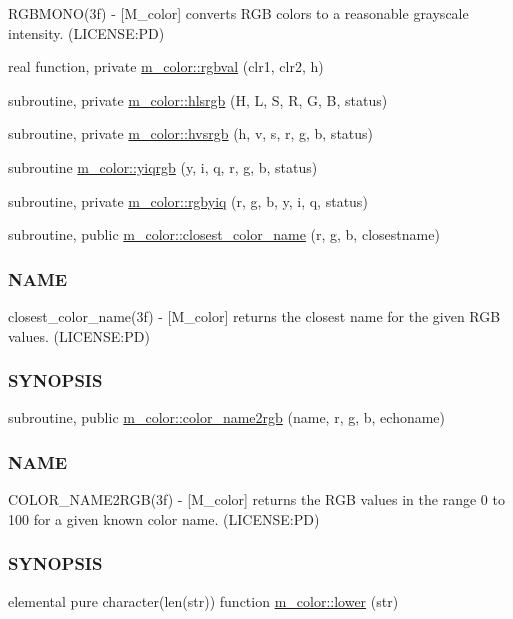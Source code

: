 \begin{DoxyCompactItemize}
\begin{DoxyCompactList}
R\+G\+B\+M\+O\+N\+O(3f) -\/ \mbox{[}M\+\_\+color\mbox{]} converts R\+GB colors to a reasonable grayscale intensity. (L\+I\+C\+E\+N\+SE\+:PD) \end{DoxyCompactList}\item 
real function, private \mbox{\hyperlink{namespacem__color_a3e97e24dba7b820f685f13eaa64a6caa}{m\+\_\+color\+::rgbval}} (clr1, clr2, h)
\item 
subroutine, private \mbox{\hyperlink{namespacem__color_a40e6c91da216384eded2157cdaf86eba}{m\+\_\+color\+::hlsrgb}} (H, L, S, R, G, B, status)
\item 
subroutine, private \mbox{\hyperlink{namespacem__color_a334ec90d94bbfb9a4c08c5f9efdb8c47}{m\+\_\+color\+::hvsrgb}} (h, v, s, r, g, b, status)
\item 
subroutine \mbox{\hyperlink{namespacem__color_ac9cd845fb9975144a6deb3a21ce29a29}{m\+\_\+color\+::yiqrgb}} (y, i, q, r, g, b, status)
\item 
subroutine, private \mbox{\hyperlink{namespacem__color_a386d004a1392b7e01ff66f1676d43def}{m\+\_\+color\+::rgbyiq}} (r, g, b, y, i, q, status)
\item 
subroutine, public \mbox{\hyperlink{namespacem__color_acad72628ee0b77cf87f40cd46734fb18}{m\+\_\+color\+::closest\+\_\+color\+\_\+name}} (r, g, b, closestname)
\begin{DoxyCompactList}\small\item\em \subsubsection*{N\+A\+ME}

closest\+\_\+color\+\_\+name(3f) -\/ \mbox{[}M\+\_\+color\mbox{]} returns the closest name for the given R\+GB values. (L\+I\+C\+E\+N\+SE\+:PD) \subsubsection*{S\+Y\+N\+O\+P\+S\+IS}\end{DoxyCompactList}\item 
subroutine, public \mbox{\hyperlink{namespacem__color_a84a36043d278bc56a7148483a862dec8}{m\+\_\+color\+::color\+\_\+name2rgb}} (name, r, g, b, echoname)
\begin{DoxyCompactList}\small\item\em \subsubsection*{N\+A\+ME}

C\+O\+L\+O\+R\+\_\+\+N\+A\+M\+E2\+R\+G\+B(3f) -\/ \mbox{[}M\+\_\+color\mbox{]} returns the R\+GB values in the range 0 to 100 for a given known color name. (L\+I\+C\+E\+N\+SE\+:PD) \subsubsection*{S\+Y\+N\+O\+P\+S\+IS}\end{DoxyCompactList}\item 
elemental pure character(len(str)) function \mbox{\hyperlink{namespacem__color_a704e93b42d777a827ec557c92d2dd7dc}{m\+\_\+color\+::lower}} (str)
\end{DoxyCompactItemize}
